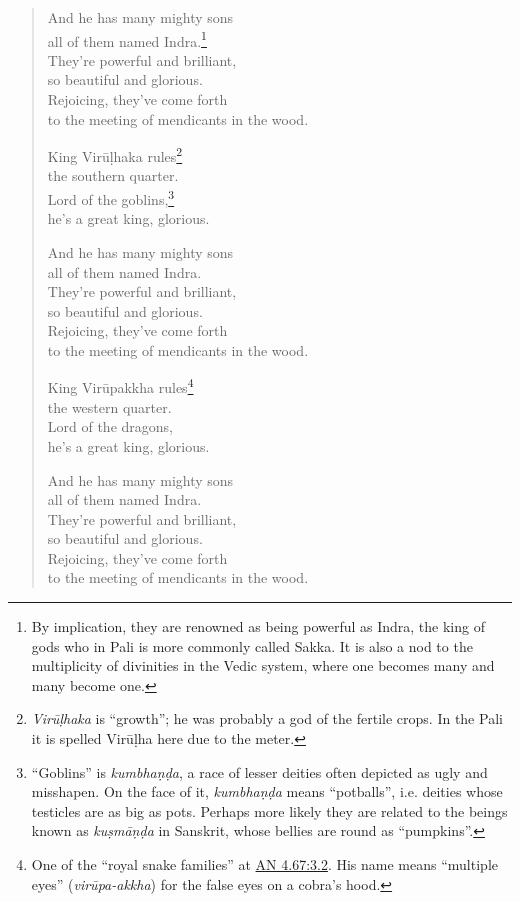 \documentclass[12pt,openany]{book}%
\begin{document}
\begin{verse}
And he has many mighty sons \\
all of them named Indra.\footnote{By implication, they are renowned as being powerful as Indra, the king of gods who in Pali is more commonly called Sakka. It is also a nod to the multiplicity of divinities in the Vedic system, where one becomes many and many become one. } \\
They’re powerful and brilliant, \\
so beautiful and glorious. \\
Rejoicing, they’ve come forth \\
to the meeting of mendicants in the wood. 

King \textsanskrit{Virūḷhaka} rules\footnote{\textit{\textsanskrit{Virūḷhaka}} is “growth”; he was probably a god of the fertile crops. In the Pali it is spelled \textsanskrit{Virūḷha} here due to the meter. } \\
the southern quarter. \\
Lord of the goblins,\footnote{“Goblins” is \textit{\textsanskrit{kumbhaṇḍa}}, a race of lesser deities often depicted as ugly and misshapen. On the face of it, \textit{\textsanskrit{kumbhaṇḍa}} means “potballs”, i.e. deities whose testicles are as big as pots. Perhaps more likely they are related to the beings known as \textit{\textsanskrit{kuṣmāṇḍa}} in Sanskrit, whose bellies are round as “pumpkins”. } \\
he’s a great king, glorious. 

And he has many mighty sons \\
all of them named Indra. \\
They’re powerful and brilliant, \\
so beautiful and glorious. \\
Rejoicing, they’ve come forth \\
to the meeting of mendicants in the wood. 

King \textsanskrit{Virūpakkha} rules\footnote{One of the “royal snake families” at \href{https://suttacentral.net/an4.67/en/sujato\#3.2}{AN 4.67:3.2}. His name means “multiple eyes” (\textit{\textsanskrit{virūpa}-akkha}) for the false eyes on a cobra’s hood. } \\
the western quarter. \\
Lord of the dragons, \\
he’s a great king, glorious. 

And he has many mighty sons \\
all of them named Indra. \\
They’re powerful and brilliant, \\
so beautiful and glorious. \\
Rejoicing, they’ve come forth \\
to the meeting of mendicants in the wood. 


\end{verse}
\end{document}
